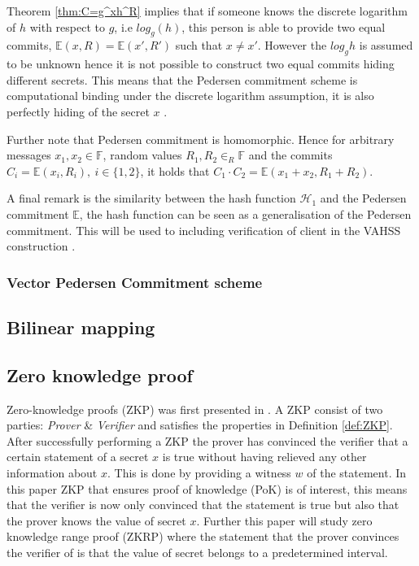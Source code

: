 Theorem \ref{thm:C=g^xh^R} implies that if someone knows the discrete logarithm of $h$ with respect to $g$, i.e $log_g(h)$, this person is able to provide two equal commits, $\mathds{E}(x,R)=\mathds{E}(x',R')$ such that $x\neq x'$. However the $log_g h$ is assumed to be unknown hence it is not possible to construct two equal commits hiding different secrets. This means that the Pedersen commitment scheme is computational binding under the discrete logarithm assumption, it is also perfectly hiding of the secret $x$ \cite{pedersen}. 

Further note that Pedersen commitment is homomorphic. Hence for arbitrary messages $x_1,x_2\in\mathds{F}$, random values $R_1,R_2\in_R\mathds{F}$ and the commits $C_i=\mathds{E}(x_i,R_i),\:i\in\{1,2\}$, it holds that $C_1\cdot C_2 = \mathds{E}(x_1+x_2,R_1+R_2)$.

A final remark is the similarity between the hash function $\mathcal{H}_1$ and the Pedersen commitment $\mathds{E}$, the hash function can be seen as a generalisation of the Pedersen commitment. This will be used to including verification of client in the VAHSS construction \cite{SumItUp}.

\subsubsection*{Vector Pedersen Commitment scheme}
\subsection*{Bilinear mapping}
\label{sec:bilinear}

\subsection*{Zero knowledge proof}
Zero-knowledge proofs  (ZKP) was first presented in \cite{OG_ZKP}. A ZKP consist of two parties: \textit{Prover} \& \textit{Verifier} and satisfies the properties  in Definition \ref{def:ZKP}. After successfully performing a ZKP the prover has convinced the verifier that a certain statement of a secret $x$ is true without having relieved any other information about $x$. This is done by providing a witness $w$ of the statement. In this paper ZKP that ensures proof of knowledge (PoK) is of interest,  this means that the verifier is now only convinced that the statement is true but also that the prover knows the value of secret $x$.  Further this paper will study zero knowledge range proof (ZKRP) where the statement that the prover convinces the verifier of is that the value of secret belongs to a predetermined interval.


